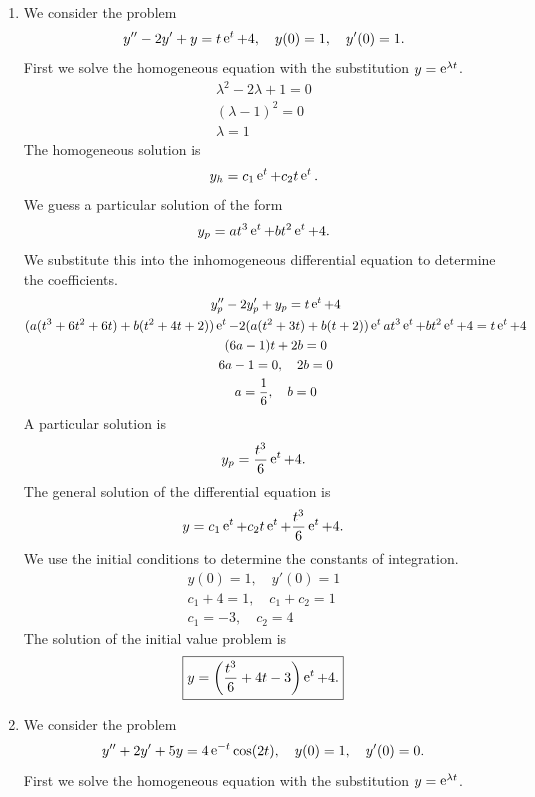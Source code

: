 {%
\begin{Solution}
  \label{solution y2yytet4}
  \begin{enumerate}
  \item 
    We consider the problem
    \[
    y'' - 2 y' + y = t \mathop{\mathrm{e}}\nolimits^t + 4, \quad y(0) = 1, \quad y'(0) = 1.
    \]
    First we solve the homogeneous equation with the substitution $y = \mathop{\mathrm{e}}\nolimits^{\lambda t}$.
    \begin{gather*}
      \lambda^2 - 2 \lambda + 1 = 0 \\
      (\lambda - 1)^2 = 0 \\
      \lambda = 1
    \end{gather*}
    The homogeneous solution is
    \[
    y_h = c_1 \mathop{\mathrm{e}}\nolimits^t + c_2 t \mathop{\mathrm{e}}\nolimits^t.
    \]
    We guess a particular solution of the form
    \[
    y_p = a t^3 \mathop{\mathrm{e}}\nolimits^t + b t^2 \mathop{\mathrm{e}}\nolimits^t + 4.
    \]
    We substitute this into the inhomogeneous differential equation to 
    determine the coefficients.
    \begin{gather*}
      y_p'' - 2 y_p' + y_p = t \mathop{\mathrm{e}}\nolimits^t + 4 \\
      ( a (t^3 + 6 t^2 + 6 t) + b (t^2 + 4 t + 2) ) \mathop{\mathrm{e}}\nolimits^t
      - 2 ( a (t^2 + 3 t) + b (t + 2) ) \mathop{\mathrm{e}}\nolimits^t
      a t^3 \mathop{\mathrm{e}}\nolimits^t + b t^2 \mathop{\mathrm{e}}\nolimits^t + 4 = t \mathop{\mathrm{e}}\nolimits^t + 4 \\
      (6 a - 1) t + 2 b = 0 \\
      6 a - 1 = 0, \quad 2 b = 0 \\
      a = \frac{1}{6}, \quad b = 0
    \end{gather*}
    A particular solution is
    \[
    y_p = \frac{t^3}{6} \mathop{\mathrm{e}}\nolimits^t + 4.
    \]
    The general solution of the differential equation is
    \[
    y = c_1 \mathop{\mathrm{e}}\nolimits^t + c_2 t \mathop{\mathrm{e}}\nolimits^t + \frac{t^3}{6} \mathop{\mathrm{e}}\nolimits^t + 4.
    \]
    We use the initial conditions to determine the constants of integration.
    \begin{gather*}
      y(0) = 1, \quad y'(0) = 1 \\
      c_1 + 4 = 1, \quad c_1 + c_2 = 1 \\
      c_1 = -3, \quad c_2 = 4
    \end{gather*}
    The solution of the initial value problem is
    \[
    \boxed{
      y = \left( \frac{t^3}{6} + 4 t - 3 \right) \mathop{\mathrm{e}}\nolimits^t + 4.
      }
    \]
  \item 
    We consider the problem
    \[
    y'' + 2 y' + 5 y = 4 \mathop{\mathrm{e}}\nolimits^{-t} \cos(2 t), \quad y(0) = 1, \quad y'(0) = 0.
    \]
    First we solve the homogeneous equation with the substitution $y = \mathop{\mathrm{e}}\nolimits^{\lambda t}$.

\end{enumerate}
\end{Solution}}
